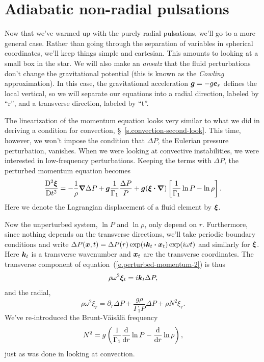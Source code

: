 \section{Adiabatic non-radial pulsations}\label{s.adiabatic-non-radial}
Now that we've warmed up with the purely radial pulsations, we'll go to a more general case.  Rather than going through the separation of variables in spherical coordinates, we'll keep things simple and cartesian.  This amounts to looking at a small box in the star.  We will also make an \emph{ansatz} that the fluid perturbations don't change the gravitational potential (this is known as the \emph{Cowling} approximation).  In this case, the gravitational acceleration $\boldsymbol{g} = -g\boldsymbol{e}_{r}$ defines the local vertical, so we will separate our equations into a radial direction, labeled by ``r'', and a transverse direction, labeled by ``t''.

The linearization of the momentum equation looks very similar to what we did in deriving a condition for convection, \S~\ref{s.convection-second-look}. This time, however, we won't impose the condition that $\Delta P$, the Eulerian pressure perturbation, vanishes. When we were looking at convective instabilities, we were interested in low-frequency perturbations.  Keeping the terms with $\Delta P$, the perturbed momentum equation becomes
\begin{equation}\label{e.perturbed-momentum-2}
\frac{\mathrm{D}^{2}\boldsymbol{\xi}}{\mathrm{D} t^{2}} = - \frac{1}{\rho}\boldsymbol{\nabla}\Delta P +  
\boldsymbol{g} \frac{1}{\Gamma_{1}}\frac{\Delta P}{P} + \boldsymbol{g}(\boldsymbol{\xi}\boldsymbol{\cdot}\boldsymbol{\nabla})\left[\frac{1}{\Gamma_{1}}\ln P-\ln \rho\right].
\end{equation}
Here we denote the Lagrangian displacement of a fluid element by $\boldsymbol{\xi}$. 

Now the unperturbed system, $\ln P$ and $\ln\rho$, only depend on $r$.  Furthermore, since nothing depends on the transverse directions, we'll take periodic boundary conditions and write
$\Delta P(\boldsymbol{x},t) = \Delta P(r) \exp(i\boldsymbol{k}_{t}\boldsymbol{\cdot} \boldsymbol{x}_{t})\exp(i\omega t)$ and similarly for $\boldsymbol{\xi}$. Here $\boldsymbol{k}_{t}$ is a transverse wavenumber and $\boldsymbol{x}_{t}$ are the transverse coordinates.
The transverse component of equation~(\ref{e.perturbed-momentum-2}) is thus
\begin{equation}\label{e.transverse-perturbed-momentum}
\rho\omega^{2} \boldsymbol{\xi}_{t} = i \boldsymbol{k}_{t} \Delta P,
\end{equation}
and the radial,
\begin{equation}\label{e.radial-perturbed-momentum}
\rho\omega^{2}\xi_{r} = \partial_{r}\Delta P + \frac{g\rho}{\Gamma_{1}P}\Delta P  + \rho N^{2} \xi_{r}.
\end{equation}
We've re-introduced the Brunt-V\"ais\"al\"a frequency
\[ N^{2} = g\left(\frac{1}{\Gamma_{1}}\frac{\mathrm{d}}{\mathrm{d} r}\ln P - \frac{\mathrm{d}}{\mathrm{d} r}\ln \rho\right), \]
just as was done in looking at convection.

